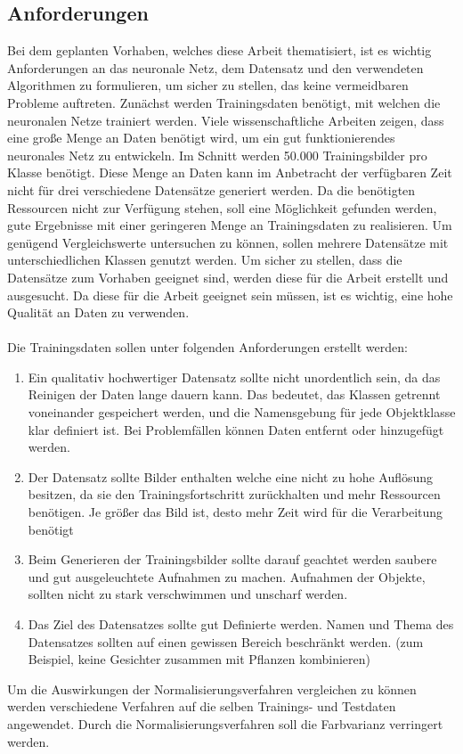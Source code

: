 \documentclass[a4paper,12pt,oneside]{article}
\begin{document}
  \subsection{Anforderungen}\label{s.anforderungen}
Bei dem geplanten Vorhaben, welches diese Arbeit thematisiert, ist es wichtig Anforderungen an das neuronale Netz, dem Datensatz und den verwendeten Algorithmen zu formulieren, um sicher zu stellen, das keine vermeidbaren Probleme auftreten. Zunächst werden Trainingsdaten benötigt, mit welchen die neuronalen Netze trainiert werden. Viele wissenschaftliche Arbeiten zeigen, dass eine große Menge an Daten benötigt wird, um ein gut funktionierendes neuronales Netz zu entwickeln. Im Schnitt werden 50.000 Trainingsbilder pro Klasse benötigt. Diese Menge an Daten kann im Anbetracht der verfügbaren Zeit nicht für drei verschiedene Datensätze generiert werden. Da die benötigten Ressourcen nicht zur Verfügung stehen, soll eine Möglichkeit gefunden werden, gute Ergebnisse mit einer geringeren Menge an Trainingsdaten zu realisieren. Um genügend Vergleichswerte untersuchen zu können, sollen mehrere Datensätze mit unterschiedlichen Klassen genutzt werden. Um sicher zu stellen, dass die Datensätze zum Vorhaben geeignet sind, werden diese für die Arbeit erstellt und ausgesucht. Da diese für die Arbeit geeignet sein müssen, ist es wichtig, eine hohe Qualität an Daten zu verwenden.\\\\
Die Trainingsdaten sollen unter folgenden Anforderungen erstellt werden:
\begin{enumerate} 
\item Ein qualitativ hochwertiger Datensatz sollte nicht unordentlich sein, da das Reinigen der Daten lange dauern kann. Das bedeutet, das Klassen getrennt voneinander gespeichert werden, und die Namensgebung für jede Objektklasse klar definiert ist. Bei Problemfällen können Daten entfernt oder hinzugefügt werden.
\item Der Datensatz sollte Bilder enthalten welche eine nicht zu hohe Auflösung besitzen, da sie den Trainingsfortschritt zurückhalten und mehr Ressourcen benötigen. Je größer das Bild ist, desto mehr Zeit wird für die Verarbeitung benötigt
\item Beim Generieren der Trainingsbilder sollte darauf geachtet werden saubere und gut ausgeleuchtete Aufnahmen zu machen. Aufnahmen der Objekte, sollten nicht zu stark verschwimmen und unscharf werden. 
\item Das Ziel des Datensatzes sollte gut Definierte werden. Namen und Thema des Datensatzes sollten auf einen gewissen Bereich beschränkt werden. (zum Beispiel, keine Gesichter zusammen mit Pflanzen kombinieren) 
\end{enumerate}
Um die Auswirkungen der Normalisierungsverfahren vergleichen zu können werden verschiedene Verfahren auf die selben Trainings- und Testdaten angewendet. Durch die Normalisierungsverfahren soll die Farbvarianz verringert werden.
\end{document}
